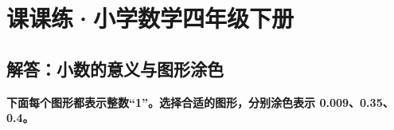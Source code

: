 \documentclass[12pt, a4paper]{ctexrep}
\begin{document}
\chapter{课课练·小学数学四年级下册}


\newpage

\section{解答：小数的意义与图形涂色}

\vspace{0.4cm}

\noindent\textbf{下面每个图形都表示整数“1”。选择合适的图形，分别涂色表示 0.009、0.35、0.4。}

\vspace{0.8cm}
\end{document}
